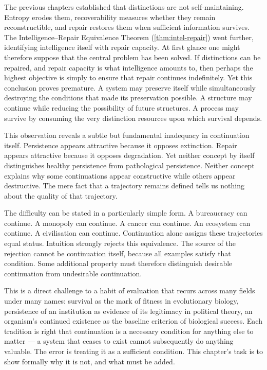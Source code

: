 \documentclass[12pt,twoside,openright]{book}
\begin{document}
The previous chapters established that distinctions are not
self-maintaining. Entropy erodes them, recoverability
measures whether they remain reconstructible, and repair
restores them when sufficient information survives. The
Intelligence--Repair Equivalence Theorem
(\cref{thm:intel-repair}) went further, identifying
intelligence itself with repair capacity. At first glance
one might therefore suppose that the central problem has
been solved. If distinctions can be repaired, and repair
capacity is what intelligence amounts to, then perhaps the
highest objective is simply to ensure that repair continues
indefinitely. Yet this conclusion proves premature. A system
may preserve itself while simultaneously destroying the
conditions that made its preservation possible. A structure
may continue while reducing the possibility of future
structures. A process may survive by consuming the very
distinction resources upon which survival depends.

This observation reveals a subtle but fundamental
inadequacy in continuation itself. Persistence appears
attractive because it opposes extinction. Repair appears
attractive because it opposes degradation. Yet neither
concept by itself distinguishes healthy persistence from
pathological persistence. Neither concept explains why some
continuations appear constructive while others appear
destructive. The mere fact that a trajectory remains
defined tells us nothing about the quality of that
trajectory.

The difficulty can be stated in a particularly simple form.
A bureaucracy can continue. A monopoly can continue. A
cancer can continue. An ecosystem can continue. A
civilisation can continue. Continuation alone assigns these
trajectories equal status. Intuition strongly rejects this
equivalence. The source of the rejection cannot be
continuation itself, because all examples satisfy that
condition. Some additional property must therefore
distinguish desirable continuation from undesirable
continuation.

This is a direct challenge to a habit of evaluation that
recurs across many fields under many names: survival as the
mark of fitness in evolutionary biology, persistence of an
institution as evidence of its legitimacy in political
theory, an organism's continued existence as the baseline
criterion of biological success. Each tradition is right that
continuation is a necessary condition for anything else to
matter --- a system that ceases to exist cannot subsequently
do anything valuable. The error is treating it as a
sufficient condition. This chapter's task is to show
formally why it is not, and what must be added.
\end{document}
